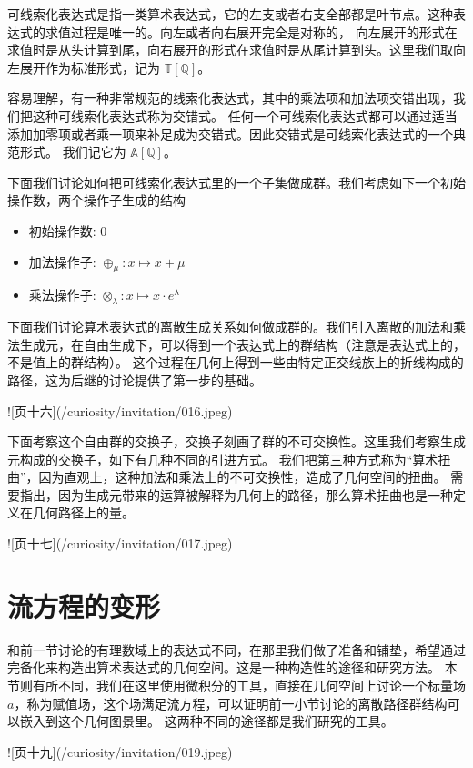 \documentclass[a4paper,12pt]{book}
\numberwithin{problem}{section}
\numberwithin{definition}{section}
\numberwithin{lemma}{section}
\numberwithin{proposition}{section}
\numberwithin{theorem}{section}
\numberwithin{grammar}{section}
\numberwithin{program}{section}
\numberwithin{convention}{section}
\numberwithin{corollary}{section}
\begin{document}
可线索化表达式是指一类算术表达式，它的左支或者右支全部都是叶节点。这种表达式的求值过程是唯一的。向左或者向右展开完全是对称的，
向左展开的形式在求值时是从头计算到尾，向右展开的形式在求值时是从尾计算到头。这里我们取向左展开作为标准形式，记为 $\mathbb{T} \left [\mathbb{Q} \right ]$。

容易理解，有一种非常规范的线索化表达式，其中的乘法项和加法项交错出现，我们把这种可线索化表达式称为交错式。
任何一个可线索化表达式都可以通过适当添加加零项或者乘一项来补足成为交错式。因此交错式是可线索化表达式的一个典范形式。
我们记它为 $\mathbb{A} \left [\mathbb{Q} \right ]$。

下面我们讨论如何把可线索化表达式里的一个子集做成群。我们考虑如下一个初始操作数，两个操作子生成的结构
\begin{itemize}
\item 初始操作数: $0$
\item 加法操作子: $\oplus_\mu: x \mapsto x + \mu$
\item 乘法操作子: $\otimes_\lambda: x \mapsto x \cdot e^\lambda$
\end{itemize}


下面我们讨论算术表达式的离散生成关系如何做成群的。我们引入离散的加法和乘法生成元，在自由生成下，可以得到一个表达式上的群结构（注意是表达式上的，不是值上的群结构）。
这个过程在几何上得到一些由特定正交线族上的折线构成的路径，这为后继的讨论提供了第一步的基础。

![页十六](/curiosity/invitation/016.jpeg)

下面考察这个自由群的交换子，交换子刻画了群的不可交换性。这里我们考察生成元构成的交换子，如下有几种不同的引进方式。
我们把第三种方式称为“算术扭曲”，因为直观上，这种加法和乘法上的不可交换性，造成了几何空间的扭曲。
需要指出，因为生成元带来的运算被解释为几何上的路径，那么算术扭曲也是一种定义在几何路径上的量。

![页十七](/curiosity/invitation/017.jpeg)

\section{流方程的变形}

和前一节讨论的有理数域上的表达式不同，在那里我们做了准备和铺垫，希望通过完备化来构造出算术表达式的几何空间。这是一种构造性的途径和研究方法。
本节则有所不同，我们在这里使用微积分的工具，直接在几何空间上讨论一个标量场$a$，称为赋值场，这个场满足流方程，可以证明前一小节讨论的离散路径群结构可以嵌入到这个几何图景里。
这两种不同的途径都是我们研究的工具。

![页十九](/curiosity/invitation/019.jpeg)
\end{document}
